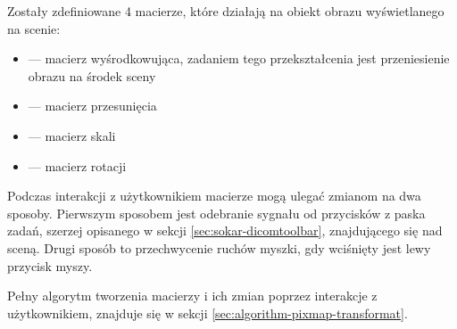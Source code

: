 Zostały zdefiniowane 4 macierze, które działają na obiekt obrazu wyświetlanego na scenie:
\begin{itemize}
    \item {} --- macierz wyśrodkowująca, zadaniem tego przekształcenia jest przeniesienie obrazu na środek sceny
    \item {} --- macierz przesunięcia
    \item {} --- macierz skali
    \item {} --- macierz rotacji
\end{itemize}

\par
Podczas interakcji z użytkownikiem macierze mogą ulegać zmianom na dwa sposoby.
Pierwszym sposobem jest odebranie sygnału od przycisków z paska zadań, szerzej opisanego w sekcji \ref{sec:sokar-dicomtoolbar}, znajdującego się nad sceną.
Drugi sposób to przechwycenie ruchów myszki, gdy wciśnięty jest lewy przycisk myszy.
\par
Pełny algorytm tworzenia macierzy i ich zmian poprzez interakcje z użytkownikiem, znajduje się w sekcji \ref{sec:algorithm-pixmap-transformat}.